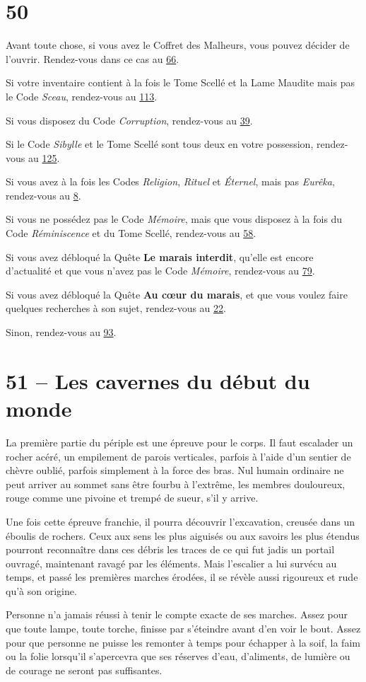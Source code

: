 \documentclass{report}
\newcommand{\gsection}[1]{
    \section{#1}
    \label{section-#1}
}
\newcommand{\glink}[1]{\hyperref[section-#1]{#1}}
\begin{document}
\gsection{50}

Avant toute chose, si vous avez le Coffret des Malheurs, vous pouvez décider de l'ouvrir. Rendez-vous dans ce cas au \glink{66}.

Si votre inventaire contient à la fois le Tome Scellé et la Lame Maudite mais pas le Code \emph{Sceau}, rendez-vous au \glink{113}.

Si vous disposez du Code \emph{Corruption}, rendez-vous au \glink{39}.

Si le Code \emph{Sibylle} et le Tome Scellé sont tous deux en votre possession, rendez-vous au \glink{125}.

Si vous avez à la fois les Codes \emph{Religion}, \emph{Rituel} et \emph{Éternel}, mais pas \emph{Eurêka}, rendez-vous au \glink{8}.

Si vous ne possédez pas le Code \emph{Mémoire}, mais que vous disposez à la fois du Code \emph{Réminiscence} et du Tome Scellé, rendez-vous au \glink{58}.

Si vous avez débloqué la Quête \textbf{Le marais interdit}, qu'elle est encore d'actualité et que vous n'avez pas le Code \emph{Mémoire}, rendez-vous au \glink{79}.

Si vous avez débloqué la Quête \textbf{Au cœur du marais}, et que vous voulez faire quelques recherches à son sujet, rendez-vous au \glink{22}.

Sinon, rendez-vous au \glink{93}.

\gsection{51 – Les cavernes du début du monde}

La première partie du périple est une épreuve pour le corps. Il faut escalader un rocher acéré, un empilement de parois verticales, parfois à l'aide d'un sentier de chèvre oublié, parfois simplement à la force des bras. Nul humain ordinaire ne peut arriver au sommet sans être fourbu à l'extrême, les membres douloureux, rouge comme une pivoine et trempé de sueur, s'il y arrive.

Une fois cette épreuve franchie, il pourra découvrir l'excavation, creusée dans un éboulis de rochers. Ceux aux sens les plus aiguisés ou aux savoirs les plus étendus pourront reconnaître dans ces débris les traces de ce qui fut jadis un portail ouvragé, maintenant ravagé par les éléments. Mais l'escalier a lui survécu au temps, et passé les premières marches érodées, il se révèle aussi rigoureux et rude qu'à son origine.

Personne n'a jamais réussi à tenir le compte exacte de ses marches. Assez pour que toute lampe, toute torche, finisse par s'éteindre avant d'en voir le bout. Assez pour que personne ne puisse les remonter à temps pour échapper à la soif, la faim ou la folie lorsqu'il s'apercevra que ses réserves d'eau, d'aliments, de lumière ou de courage ne seront pas suffisantes.
\end{document}
